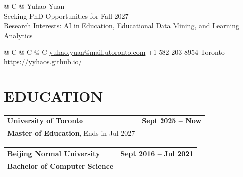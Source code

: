 \documentclass[a4paper,11pt]{article}
\begin{document}
\pagestyle{empty} 

\begin{tabularx}{\linewidth}{@{} C @{}}
\Huge{Yuhao Yuan} \\[6pt]
\large{Seeking PhD Opportunities for Fall 2027} \\[3pt]
\normalsize{Research Interests: AI in Education, Educational Data Mining, and Learning Analytics}
\end{tabularx}

\begin{tabularx}{\linewidth}{@{} C @{} C @{} C}
{{\href{mailto:yuhao.yuan@mail.utoronto.com}{\raisebox{-0.05\height}{\faEnvelope} yuhao.yuan@mail.utoronto.com}}}
{{\raisebox{-0.05\height}{\faMobile} +1 582 203 8954}} 
{{\raisebox{-0.05\height}{\faMapMarker} Toronto}}
{{\href{https://yyhaos.github.io/}{\raisebox{-0.05\height}{\faGithub} https://yyhaos.github.io/}}}
\end{tabularx}

\hfill
\section{\textbf{EDUCATION}}
\begin{tabularx}{\linewidth}{ @{}X r@{} }
    \textbf{University of Toronto} & \textbf{Sept 2025 -- Now} \\[4pt]
    \textbf{Master of Education}, Ends in Jul 2027\\[4pt]
\end{tabularx}
\begin{tabularx}{\linewidth}{ @{}X r@{} }
    \textbf{Beijing Normal University} & \textbf{Sept 2016 -- Jul 2021} \\[4pt]
    \textbf{Bachelor of Computer Science}\\[4pt]
\end{tabularx}
\hfill
\end{document}
